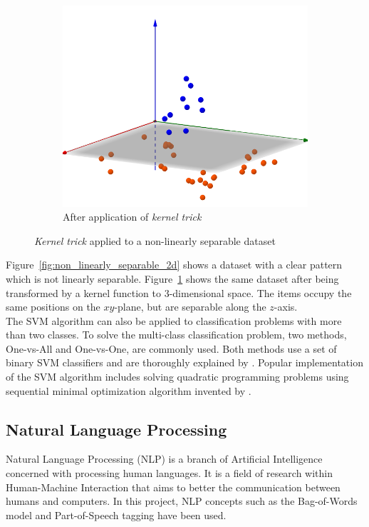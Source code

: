 \begin{figure}[t]
\begin{subfigure}[b]{0.45\textwidth}
        \includegraphics[width=\textwidth]{./figs/non_linearly_separable_classes_higher_dimension}
        \caption{After application of \textit{kernel trick}}
        \label{fig:non_linearly_separable_3d}
    \end{subfigure}
    \caption{\textit{Kernel trick} applied to a non-linearly separable dataset}
    \label{fig:non_linearly_separable_classes}
\end{figure}


Figure~\ref{fig:non_linearly_separable_2d} shows a dataset with a clear pattern which is not linearly separable. Figure~\ref{fig:non_linearly_separable_3d} shows the same dataset after being transformed by a kernel function to 3-dimensional space. The items occupy the same positions on the $xy$-plane, but are separable along the $z$-axis. \\

The SVM algorithm can also be applied to classification problems with more than two classes. To solve the multi-class classification problem, two methods, One-vs-All and One-vs-One, are commonly used. Both methods use a set of binary SVM classifiers and are thoroughly explained by \cite{HsuLin02}. Popular implementation of the SVM algorithm includes solving quadratic programming problems using sequential minimal optimization algorithm invented by \cite{Platt98}.


\subsection{Natural Language Processing}
\label{sec:background_nlp}
Natural Language Processing (NLP) is a branch of Artificial Intelligence concerned with processing human languages. It is a field of research within Human-Machine Interaction that aims to better the communication between humans and computers. In this project, NLP concepts such as the Bag-of-Words model and Part-of-Speech tagging have been used.

